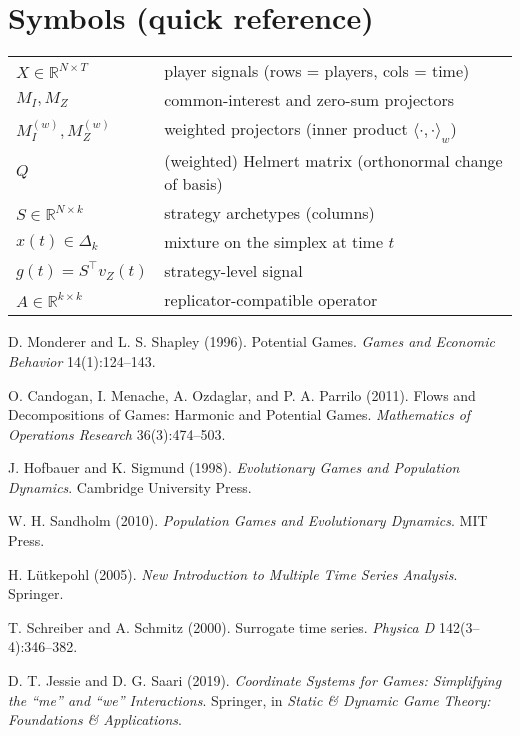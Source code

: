 \documentclass[11pt]{article}
\newcommand{\R}{\mathbb{R}}
\begin{document}
\section{Symbols (quick reference)}
\begin{center}
\begin{tabular}{ll}
$X\in\R^{N\times T}$ & player signals (rows = players, cols = time) \\
$M_I, M_Z$ & common-interest and zero-sum projectors \\
$M_I^{(w)}, M_Z^{(w)}$ & weighted projectors (inner product $\langle\cdot,\cdot\rangle_w$) \\
$Q$ & (weighted) Helmert matrix (orthonormal change of basis) \\
$S\in\R^{N\times k}$ & strategy archetypes (columns) \\
$x(t)\in\Delta_k$ & mixture on the simplex at time $t$ \\
$g(t)=S^\top v_Z(t)$ & strategy-level signal \\
$A\in\R^{k\times k}$ & replicator-compatible operator \\
\end{tabular}
\end{center}

\begin{thebibliography}{9}
D. Monderer and L. S. Shapley (1996).
\newblock Potential Games.
\newblock \emph{Games and Economic Behavior} 14(1):124--143.

O. Candogan, I. Menache, A. Ozdaglar, and P. A. Parrilo (2011).
\newblock Flows and Decompositions of Games: Harmonic and Potential Games.
\newblock \emph{Mathematics of Operations Research} 36(3):474--503.

J. Hofbauer and K. Sigmund (1998).
\newblock \emph{Evolutionary Games and Population Dynamics}.
\newblock Cambridge University Press.

W. H. Sandholm (2010).
\newblock \emph{Population Games and Evolutionary Dynamics}.
\newblock MIT Press.

H. L\"{u}tkepohl (2005).
\newblock \emph{New Introduction to Multiple Time Series Analysis}.
\newblock Springer.

T. Schreiber and A. Schmitz (2000).
\newblock Surrogate time series.
\newblock \emph{Physica D} 142(3--4):346--382.

D. T. Jessie and D. G. Saari (2019).
\newblock \emph{Coordinate Systems for Games: Simplifying the ``me'' and ``we'' Interactions}.
\newblock Springer, in \emph{Static \& Dynamic Game Theory: Foundations \& Applications}.
\end{thebibliography}
\end{document}
